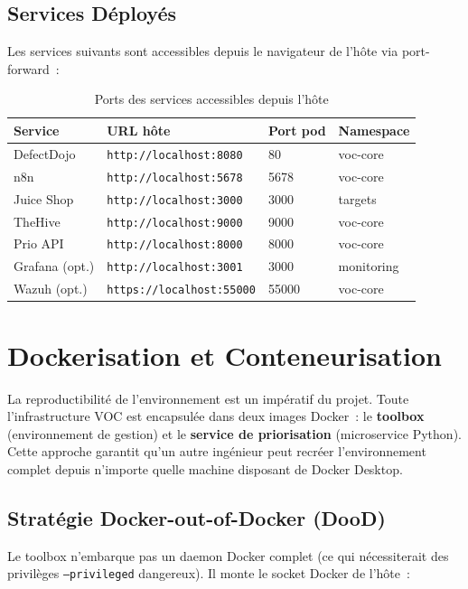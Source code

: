 \documentclass[12pt,a4paper]{report}
\begin{document}
\section{Services Déployés}
Les services suivants sont accessibles depuis le navigateur de l'hôte via port-forward~:

\begin{table}[H]
\centering
\caption{Ports des services accessibles depuis l'hôte}
\small
\begin{tabular}{l l l l}
\toprule
\textbf{Service} & \textbf{URL hôte} & \textbf{Port pod} & \textbf{Namespace} \\
\midrule
DefectDojo     & \texttt{http://localhost:8080}  & 80   & voc-core \\
n8n            & \texttt{http://localhost:5678}  & 5678 & voc-core \\
Juice Shop     & \texttt{http://localhost:3000}  & 3000 & targets \\
TheHive        & \texttt{http://localhost:9000}  & 9000 & voc-core \\
Prio API       & \texttt{http://localhost:8000}  & 8000 & voc-core \\
Grafana (opt.) & \texttt{http://localhost:3001}  & 3000 & monitoring \\
Wazuh (opt.)   & \texttt{https://localhost:55000} & 55000 & voc-core \\
\bottomrule
\end{tabular}
\end{table}


\chapter{Dockerisation et Conteneurisation}

La reproductibilité de l'environnement est un impératif du projet. Toute l'infrastructure VOC est encapsulée dans deux images Docker~: le \textbf{toolbox} (environnement de gestion) et le \textbf{service de priorisation} (microservice Python). Cette approche garantit qu'un autre ingénieur peut recréer l'environnement complet depuis n'importe quelle machine disposant de Docker Desktop.

\section{Stratégie Docker-out-of-Docker (DooD)}
Le toolbox n'embarque pas un daemon Docker complet (ce qui nécessiterait des privilèges \texttt{--privileged} dangereux). Il monte le socket Docker de l'hôte~:
\end{document}
